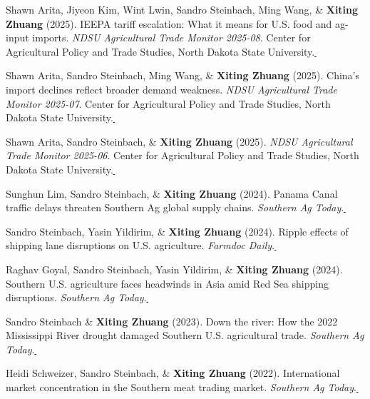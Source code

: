 \documentclass[10.5pt,letterpaper]{article}
\newcommand{\paperlink}[1]{\href{#1}{\,\small\faExternalLink}}
\renewenvironment{itemize}{
	\begin{list}{}{
			\setlength{\leftmargin}{1.5em}
		}
	}{
	\end{list}
}
\begin{document}
\begin{itemize}
		\item[-] Shawn Arita, Jiyeon Kim, Wint Lwin, Sandro Steinbach, Ming Wang, \& \textbf{Xiting Zhuang} (2025). IEEPA tariff escalation: What it means for U.S. food and ag-input imports. \textit{NDSU Agricultural Trade Monitor 2025-08}. Center for Agricultural Policy and Trade Studies, North Dakota State University.\paperlink{https://www.capts-ndsu.com/_files/ugd/3c6228_44202bdfcc8f4c01af0995141c8215fe.pdf}
		
		\item[-] Shawn Arita, Sandro Steinbach, Ming Wang, \& \textbf{Xiting Zhuang} (2025). China's import declines reflect broader demand weakness. \textit{NDSU Agricultural Trade Monitor 2025-07}. Center for Agricultural Policy and Trade Studies, North Dakota State University.\paperlink{https://www.capts-ndsu.com/_files/ugd/3c6228_d4656ab5a23e4cb2a2d9572e4817be85.pdf}
		
		\item[-] Shawn Arita, Sandro Steinbach, \& \textbf{Xiting Zhuang} (2025). \textit{NDSU Agricultural Trade Monitor 2025-06}. Center for Agricultural Policy and Trade Studies, North Dakota State University.\paperlink{https://www.capts-ndsu.com/_files/ugd/3c6228_275669f200b147d6993ae2fef14c7edc.pdf}
		
		\item[-] Sunghun Lim, Sandro Steinbach, \& \textbf{Xiting Zhuang} (2024). Panama Canal traffic delays threaten Southern Ag global supply chains. \textit{Southern Ag Today}.\paperlink{https://southernagtoday.org/2024/01/18/panama-canal-traffic-delays-threaten-southern-ag-global-supply-chains/}
		
		\item[-] Sandro Steinbach, Yasin Yildirim, \& \textbf{Xiting Zhuang} (2024). Ripple effects of shipping lane disruptions on U.S. agriculture. \textit{Farmdoc Daily}.\paperlink{https://farmdocdaily.illinois.edu/2024/01/ripple-effects-of-shipping-lane-disruptions-on-u-s-agriculture.html}
		
		\item[-] Raghav Goyal, Sandro Steinbach, Yasin Yildirim, \& \textbf{Xiting Zhuang} (2024). Southern U.S. agriculture faces headwinds in Asia amid Red Sea shipping disruptions. \textit{Southern Ag Today}.\paperlink{https://southernagtoday.org/2024/02/01/southern-u-s-agriculture-faces-headwinds-in-asia-amid-red-sea-shipping-disruptions/}
		
		\item[-] Sandro Steinbach \& \textbf{Xiting Zhuang} (2023). Down the river: How the 2022 Mississippi River drought damaged Southern U.S. agricultural trade. \textit{Southern Ag Today}.\paperlink{https://southernagtoday.org/2023/05/04/down-the-river-how-the-2022-mississippi-river-drought-damaged/}
		\item[-] Heidi Schweizer, Sandro Steinbach, \& \textbf{Xiting Zhuang} (2022). International market concentration in the Southern meat trading market. \textit{Southern Ag Today}.\paperlink{https://southernagtoday.org/2022/07/14/international-market-concentration-in-the-southern-meat-trading-market/}
		

\end{itemize}
\end{document}
